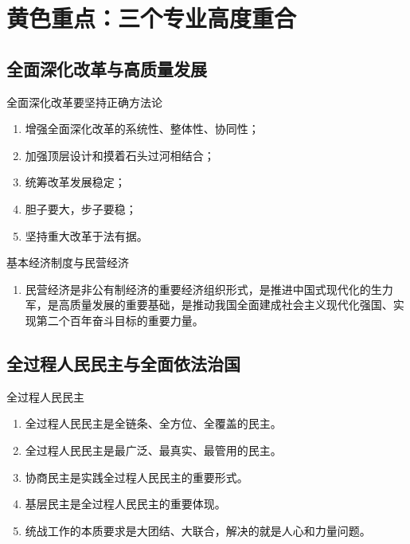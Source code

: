 \documentclass[12pt,a4paper]{ctexart}
\title{}
\author{}
\date{}
\begin{document}


\section{黄色重点：三个专业高度重合}

\subsection{全面深化改革与高质量发展}

\begin{yellowbox}{全面深化改革要坚持正确方法论}
\begin{enumerate}
  \item 增强全面深化改革的系统性、整体性、协同性；
  \item 加强顶层设计和摸着石头过河相结合；
  \item 统筹改革发展稳定；
  \item 胆子要大，步子要稳；
  \item 坚持重大改革于法有据。
\end{enumerate}
\end{yellowbox}



\begin{yellowbox}{基本经济制度与民营经济}
\begin{enumerate}
  \item 民营经济是非公有制经济的重要经济组织形式，是推进中国式现代化的生力军，是高质量发展的重要基础，是推动我国全面建成社会主义现代化强国、实现第二个百年奋斗目标的重要力量。
\end{enumerate}
\end{yellowbox}


\subsection{全过程人民民主与全面依法治国}

\begin{yellowbox}{全过程人民民主}
\begin{enumerate}
  \item 全过程人民民主是全链条、全方位、全覆盖的民主。
  \item 全过程人民民主是最广泛、最真实、最管用的民主。
  \item 协商民主是实践全过程人民民主的重要形式。
  \item 基层民主是全过程人民民主的重要体现。
  \item 统战工作的本质要求是大团结、大联合，解决的就是人心和力量问题。
\end{enumerate}
\end{yellowbox}
\end{document}
